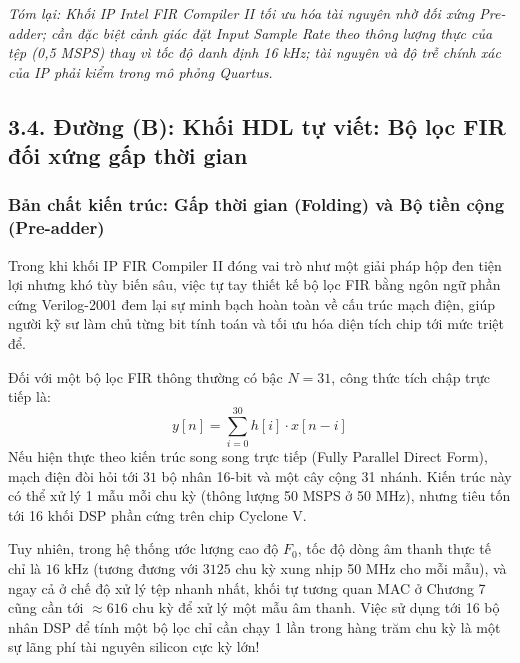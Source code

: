 \textit{Tóm lại: Khối IP Intel FIR Compiler II tối ưu hóa tài nguyên nhờ đối xứng Pre-adder; cần đặc biệt cảnh giác đặt Input Sample Rate theo thông lượng thực của tệp (0,5 MSPS) thay vì tốc độ danh định 16 kHz; tài nguyên và độ trễ chính xác của IP phải kiểm trong mô phỏng Quartus.}

\subsection*{3.4. Đường (B): Khối HDL tự viết: Bộ lọc FIR đối xứng gấp thời gian}

\subsubsection*{Bản chất kiến trúc: Gấp thời gian (Folding) và Bộ tiền cộng (Pre-adder)}
Trong khi khối IP FIR Compiler II đóng vai trò như một giải pháp hộp đen tiện lợi nhưng khó tùy biến sâu, việc tự tay thiết kế bộ lọc FIR bằng ngôn ngữ phần cứng Verilog-2001 đem lại sự minh bạch hoàn toàn về cấu trúc mạch điện, giúp người kỹ sư làm chủ từng bit tính toán và tối ưu hóa diện tích chip tới mức triệt để.

Đối với một bộ lọc FIR thông thường có bậc $N = 31$, công thức tích chập trực tiếp là:
\begin{equation}
y[n] = \sum_{i=0}^{30} h[i] \cdot x[n - i]
\end{equation}
Nếu hiện thực theo kiến trúc song song trực tiếp (Fully Parallel Direct Form), mạch điện đòi hỏi tới $31$ bộ nhân 16-bit và một cây cộng 31 nhánh. Kiến trúc này có thể xử lý 1 mẫu mỗi chu kỳ (thông lượng 50 MSPS ở 50 MHz), nhưng tiêu tốn tới 16 khối DSP phần cứng trên chip Cyclone V.

Tuy nhiên, trong hệ thống ước lượng cao độ $F_0$, tốc độ dòng âm thanh thực tế chỉ là $16\text{ kHz}$ (tương đương với $3125$ chu kỳ xung nhịp 50 MHz cho mỗi mẫu), và ngay cả ở chế độ xử lý tệp nhanh nhất, khối tự tương quan MAC ở Chương 7 cũng cần tới $\approx 616\text{ chu kỳ}$ để xử lý một mẫu âm thanh. Việc sử dụng tới 16 bộ nhân DSP để tính một bộ lọc chỉ cần chạy 1 lần trong hàng trăm chu kỳ là một sự lãng phí tài nguyên silicon cực kỳ lớn!

